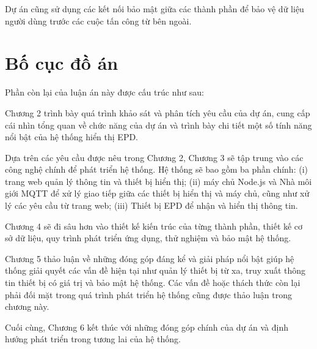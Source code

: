 \documentclass[../DoAn.tex]{subfiles}
\begin{document}
Dự án cũng sử dụng các kết nối bảo mật giữa các thành phần để bảo vệ dữ liệu người dùng trước các cuộc tấn công từ bên ngoài.
\section{Bố cục đồ án}
\label{section:1.4}
Phần còn lại của luận án này được cấu trúc như sau:

Chương 2 trình bày quá trình khảo sát và phân tích yêu cầu của dự án, cung cấp cái nhìn tổng quan về chức năng của dự án và trình bày chi tiết một số tính năng nổi bật của hệ thống hiển thị EPD.

Dựa trên các yêu cầu được nêu trong Chương 2, Chương 3 sẽ tập trung vào các công nghệ chính để phát triển hệ thống. Hệ thống sẽ bao gồm ba phần chính: (i) trang web quản lý thông tin và thiết bị hiển thị; (ii) máy chủ Node.js và Nhà môi giới MQTT để xử lý giao tiếp giữa các thiết bị hiển thị và máy chủ, cũng như xử lý các yêu cầu từ trang web; (iii) Thiết bị EPD để nhận và hiển thị thông tin.

Chương 4 sẽ đi sâu hơn vào thiết kế kiến trúc của từng thành phần, thiết kế cơ sở dữ liệu, quy trình phát triển ứng dụng, thử nghiệm và bảo mật hệ thống.

Chương 5 thảo luận về những đóng góp đáng kể và giải pháp nổi bật giúp hệ thống giải quyết các vấn đề hiện tại như quản lý thiết bị từ xa, truy xuất thông tin thiết bị có giá trị và bảo mật hệ thống. Các vấn đề hoặc thách thức còn lại phải đối mặt trong quá trình phát triển hệ thống cũng được thảo luận trong chương này.

Cuối cùng, Chương 6 kết thúc với những đóng góp chính của dự án và định hướng phát triển trong tương lai của hệ thống.
\end{document}
